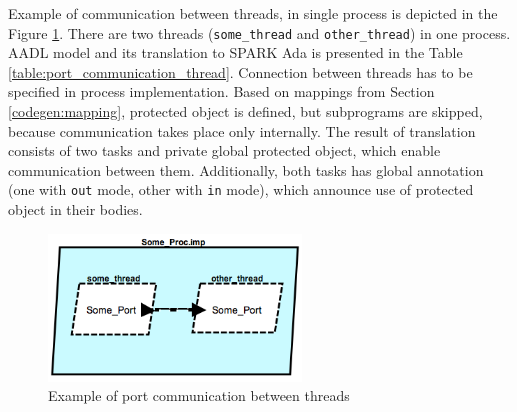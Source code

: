 Example of communication between threads, in single process is depicted in the Figure \ref{figure:port_communication_thread}. There are two threads (\lstinline{some_thread} and \lstinline{other_thread}) in one process. AADL model and its translation to SPARK Ada is presented in the Table \ref{table:port_communication_thread}. Connection between threads has to be specified in process implementation. Based on mappings from Section \ref{codegen:mapping}, protected object is defined, but subprograms are skipped, because communication takes place only internally. The result of translation consists of two tasks and private global protected object, which enable communication between them. Additionally, both tasks has global annotation (one with \lstinline{out} mode, other with \lstinline{in} mode), which announce use of protected object in their bodies.

\begin{figure}[ht]%
    \begin{center}
    	\includegraphics[width=0.6\textwidth]{figures/port-communication-thread.png}    	
    \end{center}
    \caption{Example of port communication between threads}
    \label{figure:port_communication_thread}
\end{figure}

